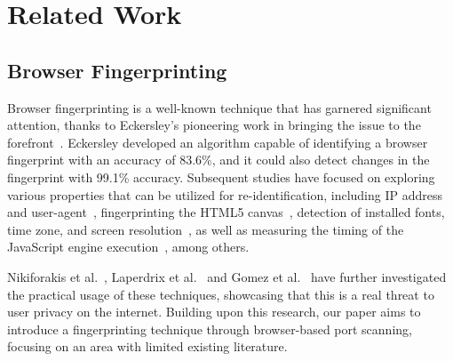 \chapter{Related Work}





\section{Browser Fingerprinting}
\label{browser-fingerprinting}

Browser fingerprinting is a well-known technique that has garnered significant attention, thanks to Eckersley's pioneering work in bringing the issue to the forefront~\cite{eckersley2010}. Eckersley developed an algorithm capable of identifying a browser fingerprint with an accuracy of 83.6\%, and it could also detect changes in the fingerprint with 99.1\% accuracy. Subsequent studies have focused on exploring various properties that can be utilized for re-identification, including IP address and user-agent~\cite{yen2012}, fingerprinting the HTML5 canvas~\cite{mowery2012}, detection of installed fonts, time zone, and screen resolution~\cite{boda2012}, as well as measuring the timing of the JavaScript engine execution~\cite{mowery2011,rokicki2021}, among others.

Nikiforakis et al.~\cite{nikiforakis2013}, Laperdrix et al.~\cite{laperdrix2016} and Gomez et al.~\cite{gomez2018} have further investigated the practical usage of these techniques, showcasing that this is a real threat to user privacy on the internet. Building upon this research, our paper aims to introduce a fingerprinting technique through browser-based port scanning, focusing on an area with limited existing literature.

